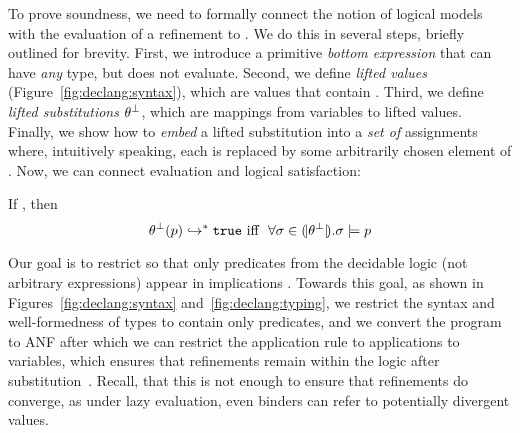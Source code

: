 
To prove soundness, we need to formally connect the
notion of logical models with the evaluation of a 
refinement to \etrue.
%
We do this in several steps, briefly outlined for brevity.
%
First, we introduce a primitive \emph{bottom expression} 
\ebot that can have \emph{any} \Div type, but does not evaluate.
%
Second, we define \emph{lifted values} \botv 
(Figure~\ref{fig:declang:syntax}), which are values that
contain \ebot.
%
Third, we define \emph{lifted substitutions} 
$\theta^\perp$, which are mappings from variables to 
lifted values.
%
Finally, we show how to \emph{embed} a lifted substitution 
\botsto into a \emph{set of} assignments \embed{\botsto} 
where, intuitively speaking, each \ebot is replaced by
some arbitrarily chosen element of \dom.
%
Now, we can connect evaluation and logical satisfaction:
%
\begin{theorem}\label{thm:equiv}
If , then
$$\evals{\botsto(p)}{\etrue}\ 
\mbox{iff}\ \ 
\forall \sigma \in \embed{\botsto}. \lmodels{\sigma}{p}$$
\end{theorem}

Our goal is to restrict \rimpl so that only predicates 
from the decidable logic \logiclang (not arbitrary expressions)
appear in implications \isimplied{\Env}{\p_1}{\p_2}.
%
Towards this goal, as shown in Figures~\ref{fig:declang:syntax}
and~\ref{fig:declang:typing}, 
we restrict the syntax and well-formedness of types to contain
only predicates,
%
and we convert the program to ANF after which we can 
restrict the application rule \rtappd to applications 
to variables, which ensures that refinements remain 
within the logic after substitution~\cite{LiquidPLDI08}.
%
Recall, that this is not enough to ensure that refinements do converge, 
as under lazy evaluation,
even binders can refer to potentially divergent values.

